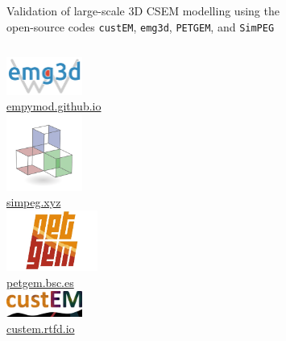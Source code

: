 \documentclass[xcolor=svgnames, aspectratio=169]{beamer}
\newcommand{\emg}[2]{\texttt{emg#1#2}\xspace}
\newcommand{\simpeg}{\texttt{SimPEG}\xspace}
\newcommand{\custem}{\texttt{custEM}\xspace}
\newcommand{\petgem}{\texttt{PETGEM}\xspace}
\begin{document}
\begin{frame}[c]%
  {Validation of large-scale 3D CSEM modelling using the\\
   open-source codes \custem, \emg3d, \petgem, and \simpeg}
  \vspace{.3cm}
  \begin{columns}[c]
      \centering
      \includegraphics[width=2.5cm]{Logo-emg3d}\\
      \href{https://empymod.github.io}{empymod.github.io}\\[.5cm]
      \includegraphics[width=2.5cm]{Logo-SimPEG}\\[-.4cm]
      \href{https://simpeg.xyz}{simpeg.xyz}\\[1cm]
      \centering
      \includegraphics[width=3.0cm]{Logo-PETGEM}\\
      \href{http://petgem.bsc.es}{petgem.bsc.es}\\[1cm]
      \includegraphics[width=2.5cm]{Logo-custEM}\\
      \href{https://custem.rtfd.io}{custem.rtfd.io}\\[.5cm]~


\end{columns}
\end{frame}
\end{document}
